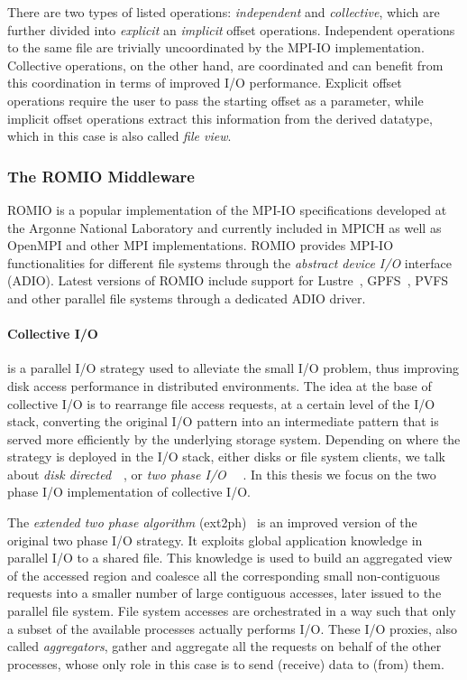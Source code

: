 There are two types of listed operations: \textit{independent} and \textit{collective}, which are further divided into \textit{explicit} an \textit{implicit} offset operations. Independent operations
to the same file are trivially uncoordinated by the MPI-IO implementation. Collective operations, on the other hand, are coordinated and can benefit from this coordination in terms of improved I/O
performance. Explicit offset operations require the user to pass the starting offset as a parameter, while implicit offset operations extract this information from the derived datatype, which in this 
case is also called \textit{file view}.

\subsubsection{The ROMIO Middleware}
ROMIO is a popular implementation of the MPI-IO specifications developed at the Argonne National Laboratory and currently included in MPICH as well as OpenMPI and other MPI implementations. ROMIO provides 
MPI-IO functionalities for different file systems through the \textit{abstract device I/O} interface~\cite{ThakurGL96} (ADIO). Latest versions of ROMIO include support for Lustre~\cite{Ying08}, 
GPFS~\cite{ProstTHKW00}, PVFS and other parallel file systems through a dedicated ADIO driver.

\paragraph{Collective I/O} is a parallel I/O strategy used to alleviate the small I/O problem, thus improving disk access performance in distributed environments. The idea at the base of collective I/O is to 
rearrange file access requests, at a certain level of the I/O stack, converting the original I/O pattern into an intermediate pattern that is served more efficiently by the underlying storage system. 
Depending on where the strategy is deployed in the I/O stack, either disks or file system clients, we talk about \textit{disk directed}~\cite{kotz1994}~\cite{Panda1995}, or \textit{two phase I/O}
~\cite{delRosario1993}~\cite{Bordawekar1993}. In this thesis we focus on the two phase I/O implementation of collective I/O.

The \textit{extended two phase algorithm} (ext2ph)~\cite{ThakurC96} is an improved version of the original two phase I/O strategy. It exploits global application knowledge in parallel I/O to a shared file. 
This knowledge is used to build an aggregated view of the accessed region and coalesce all the corresponding small non-contiguous requests into a smaller number of large contiguous accesses, later issued to 
the parallel file system. File system accesses are orchestrated in a way such that only a subset of the available processes actually performs I/O. These I/O proxies, also called \textit{aggregators}, gather 
and aggregate all the requests on behalf of the other processes, whose only role in this case is to send (receive) data to (from) them. 

